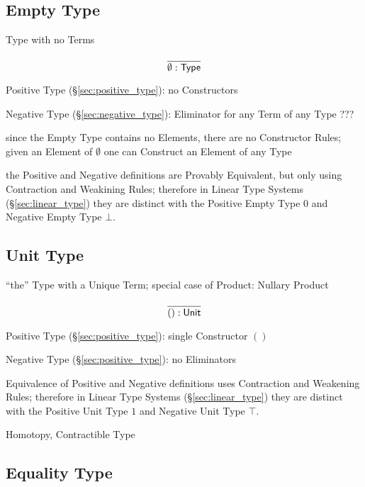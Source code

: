 \subsection{Empty Type}\label{sec:empty_type}

Type with no Terms

\[
  \frac{}
  {\emptyset:\mathsf{Type}}
\]


Positive Type (\S\ref{sec:positive_type}): no Constructors

Negative Type (\S\ref{sec:negative_type}): Eliminator for any Term of
any Type ???

since the Empty Type contains no Elements, there are no Constructor
Rules; given an Element of $\emptyset$ one can Construct an Element of
any Type

the Positive and Negative definitions are Provably Equivalent, but
only using Contraction and Weakining Rules; therefore in Linear Type
Systems (\S\ref{sec:linear_type}) they are distinct with the Positive
Empty Type $0$ and Negative Empty Type $\bot$.



\subsection{Unit Type}\label{sec:unit_type}

``the'' Type with a Unique Term; special case of Product: Nullary
Product

\[
  \frac{}
  {():\mathsf{Unit}}
\]

Positive Type (\S\ref{sec:positive_type}): single Constructor $()$

Negative Type (\S\ref{sec:positive_type}): no Eliminators

Equivalence of Positive and Negative definitions uses Contraction and
Weakening Rules; therefore in Linear Type Systems
(\S\ref{sec:linear_type}) they are distinct with the Positive Unit
Type $1$ and Negative Unit Type $\top$.

Homotopy, Contractible Type %



\subsection{Equality Type}\label{sec:equality_type}

